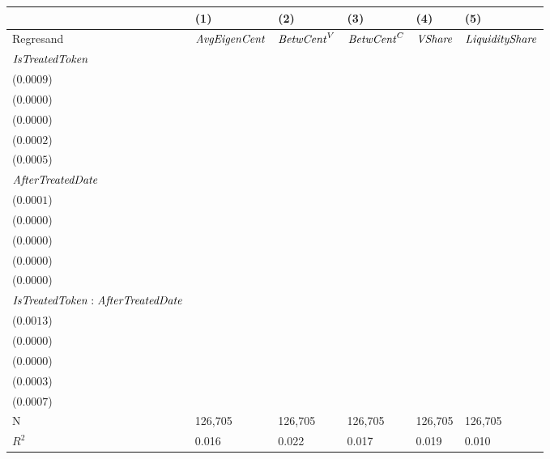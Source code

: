 \begin{tabular}{llllll}
\toprule
{} &                                      (1) &                                      (2) &                                      (3) &                                      (4) &                                      (5) \\
\midrule
Regresand                                     &                     ${\it AvgEigenCent}$ &                       ${\it BetwCent}^V$ &                       ${\it BetwCent}^C$ &                           ${\it VShare}$ &                   ${\it LiquidityShare}$ \\
${\it IsTreatedToken}$                        &  \makecell{$0.0125^{***}$ \\ ($0.0009$)} &  \makecell{$0.0003^{***}$ \\ ($0.0000$)} &  \makecell{$0.0001^{***}$ \\ ($0.0000$)} &  \makecell{$0.0035^{***}$ \\ ($0.0002$)} &  \makecell{$0.0087^{***}$ \\ ($0.0005$)} \\
${\it AfterTreatedDate}$                      &  \makecell{$0.0021^{***}$ \\ ($0.0001$)} &  \makecell{$0.0000^{***}$ \\ ($0.0000$)} &  \makecell{$0.0000^{***}$ \\ ($0.0000$)} &  \makecell{$0.0006^{***}$ \\ ($0.0000$)} &  \makecell{$0.0009^{***}$ \\ ($0.0000$)} \\
${\it IsTreatedToken}:{\it AfterTreatedDate}$ &  \makecell{$0.0059^{***}$ \\ ($0.0013$)} &   \makecell{$0.0000^{**}$ \\ ($0.0000$)} &     \makecell{$0.0000^{}$ \\ ($0.0000$)} &  \makecell{$0.0015^{***}$ \\ ($0.0003$)} &  \makecell{$-0.0016^{**}$ \\ ($0.0007$)} \\
\midrule N                                    &                                  126,705 &                                  126,705 &                                  126,705 &                                  126,705 &                                  126,705 \\
$R^2$                                         &                                    0.016 &                                    0.022 &                                    0.017 &                                    0.019 &                                    0.010 \\
\bottomrule
\end{tabular}
